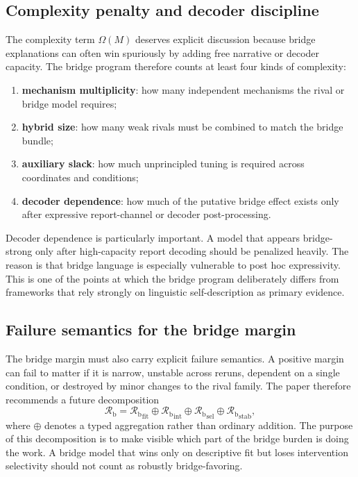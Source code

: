 \documentclass[11pt,a4paper]{article}
\theoremstyle{definition}
\newcommand{\BridgeMargin}{\mathcal{R}_{\mathrm{b}}}
\begin{document}
\subsection{Complexity penalty and decoder discipline}
The complexity term $\Omega(M)$ deserves explicit discussion because bridge explanations can often win spuriously by adding free narrative or decoder capacity. The bridge program therefore counts at least four kinds of complexity:
\begin{enumerate}[leftmargin=1.5em]
\item \textbf{mechanism multiplicity}: how many independent mechanisms the rival or bridge model requires;
\item \textbf{hybrid size}: how many weak rivals must be combined to match the bridge bundle;
\item \textbf{auxiliary slack}: how much unprincipled tuning is required across coordinates and conditions;
\item \textbf{decoder dependence}: how much of the putative bridge effect exists only after expressive report-channel or decoder post-processing.
\end{enumerate}

Decoder dependence is particularly important. A model that appears bridge-strong only after high-capacity report decoding should be penalized heavily. The reason is that bridge language is especially vulnerable to post hoc expressivity. This is one of the points at which the bridge program deliberately differs from frameworks that rely strongly on linguistic self-description as primary evidence.

\subsection{Failure semantics for the bridge margin}
The bridge margin must also carry explicit failure semantics. A positive margin can fail to matter if it is narrow, unstable across reruns, dependent on a single condition, or destroyed by minor changes to the rival family. The paper therefore recommends a future decomposition
\[
\BridgeMargin=
{\BridgeMargin}_{\mathrm{fit}}
\oplus
{\BridgeMargin}_{\mathrm{int}}
\oplus
{\BridgeMargin}_{\mathrm{sel}}
\oplus
{\BridgeMargin}_{\mathrm{stab}},
\]
where $\oplus$ denotes a typed aggregation rather than ordinary addition. The purpose of this decomposition is to make visible which part of the bridge burden is doing the work. A bridge model that wins only on descriptive fit but loses intervention selectivity should not count as robustly bridge-favoring.
\end{document}
